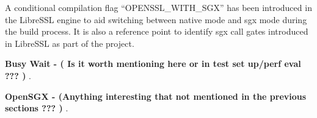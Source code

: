 \documentclass[../main.tex]{subfiles}
\begin{document}
A conditional compilation flag “OPENSSL\_WITH\_SGX” has been introduced in the LibreSSL engine to aid switching between native mode and sgx mode during the build process. It is also a reference point to identify sgx call gates introduced in LibreSSL as part of the project.

\textbf{ Busy Wait - ( Is it worth mentioning here or in test set up/perf eval ??? ) }.

\textbf{ OpenSGX - (Anything interesting that not mentioned in the previous sections ??? ) }.
\end{document}
